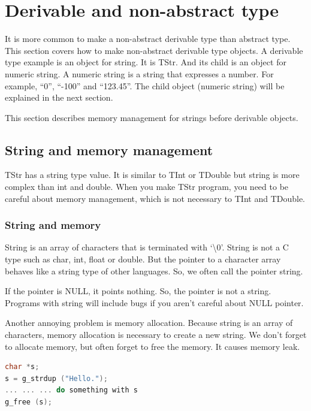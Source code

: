 \section{Derivable and non-abstract
type}\label{derivable-and-non-abstract-type}

It is more common to make a non-abstract derivable type than abstract
type. This section covers how to make non-abstract derivable type
objects. A derivable type example is an object for string. It is TStr.
And its child is an object for numeric string. A numeric string is a
string that expresses a number. For example, ``0'', ``-100'' and
``123.45''. The child object (numeric string) will be explained in the
next section.

This section describes memory management for strings before derivable
objects.

\subsection{String and memory
management}\label{string-and-memory-management}

TStr has a string type value. It is similar to TInt or TDouble but
string is more complex than int and double. When you make TStr program,
you need to be careful about memory management, which is not necessary
to TInt and TDouble.

\subsubsection{String and memory}\label{string-and-memory}

String is an array of characters that is terminated with
`\textbackslash0'. String is not a C type such as char, int, float or
double. But the pointer to a character array behaves like a string type
of other languages. So, we often call the pointer string.

If the pointer is NULL, it points nothing. So, the pointer is not a
string. Programs with string will include bugs if you aren't careful
about NULL pointer.

Another annoying problem is memory allocation. Because string is an
array of characters, memory allocation is necessary to create a new
string. We don't forget to allocate memory, but often forget to free the
memory. It causes memory leak.

\begin{lstlisting}[language=C]
char *s;
s = g_strdup ("Hello.");
... ... ... do something with s
g_free (s);
\end{lstlisting}

